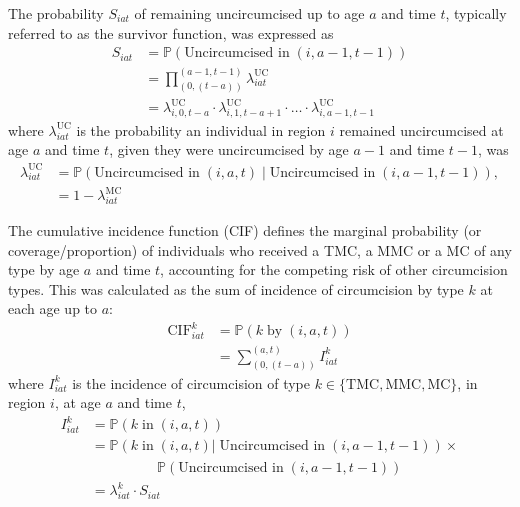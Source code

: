 \documentclass{article}
\begin{document}
\begin{appendix}
The probability $S_{iat}$ of remaining uncircumcised up to age $a$ and time $t$,  typically referred to as the survivor function, was expressed as
\begin{equation}
	\begin{split}
		S_{iat} &= \mathbb{P}(\text{Uncircumcised in} \; (i,a-1,t-1)) \\
				&= \prod_{(0,(t-a))}^{(a-1,t-1)}\lambda^{\text{UC}}_{iat} \\
				&= \lambda^{\text{UC}}_{i,0,t-a}\cdot \lambda^{\text{UC}}_{i,1,t-a+1}\cdot\ldots \cdot\lambda^{\text{UC}}_{i,a-1,t-1}
	\end{split}
	\label{eqn::survfunc}
\end{equation}
where $\lambda^{\text{UC}}_{iat}$ is the probability an individual in region $i$ remained uncircumcised at age $a$ and time $t$, given they were uncircumcised by age $a-1$ and time $t-1$, was
\begin{equation*}
	\begin{split}
		\lambda^{\text{UC}}_{iat} &= \mathbb{P}(\text{Uncircumcised in}  \; (i,a,t) \; | \; \text{Uncircumcised in} \; (i,a-1, t-1)),\\
		&= 1 - \lambda^{\text{MC}}_{iat} 
	\end{split}
	\label{eqn::uncirc}
\end{equation*}

The cumulative incidence function (CIF) defines the marginal probability (or coverage/proportion) of individuals who received a TMC, a MMC or a MC of any type by age $a$ and time $t$, accounting for the competing risk of other circumcision types. This was calculated as the sum of incidence of circumcision by type $k$ at each age up to $a$:
\begin{equation*}
	\begin{split}
		\text{CIF}_{iat}^k &= \mathbb{P}(k \; \text{by} \; (i,a,t)) \\
		&= \sum_{(0,(t-a))}^{(a,t)} I^k_{iat}
	\end{split}
	\label{eqn::cuminc}
\end{equation*}
where $I^k_{iat}$ is the incidence of circumcision of type $k\in \{\textrm{TMC}, \textrm{MMC}, \textrm{MC}\}$, in region $i$, at age $a$ and time $t$, 
\begin{equation*}
	\begin{split}
		I_{iat}^k &= \mathbb{P}(k \; \text{in} \; (i,a,t)) \\
		       &= \mathbb{P}(k \; \text{in} \; (i,a,t) | \; \text{Uncircumcised in} \; (i,a-1,t-1))\times \\
		       & \;\;\;\;\;\;\;\;\;\;\;\;\;\;\;\;\;\mathbb{P}(\text{Uncircumcised in} \; (i,a-1,t-1)) \\
	    	   &= \lambda_{iat}^k \cdot S_{iat} 
	\end{split}
	\label{eqn::inc}
\end{equation*}


\end{appendix}
\end{document}
